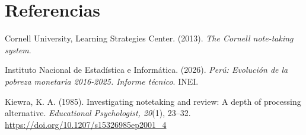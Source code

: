 \documentclass{academic-report}
\begin{document}
\section*{Referencias}
{\setlength{\parindent}{0pt}
\hangindent=1.27cm
Cornell University, Learning Strategies Center. (2013). \textit{The Cornell note-taking system}.\par
\hangindent=1.27cm
Instituto Nacional de Estadística e Informática. (2026). \textit{Perú: Evolución de la pobreza
monetaria 2016-2025. Informe técnico}. INEI.\par
\hangindent=1.27cm
Kiewra, K. A. (1985). Investigating notetaking and review: A depth of processing alternative.
\textit{Educational Psychologist, 20}(1), 23–32. \url{https://doi.org/10.1207/s15326985ep2001_4}\par}
\end{document}
